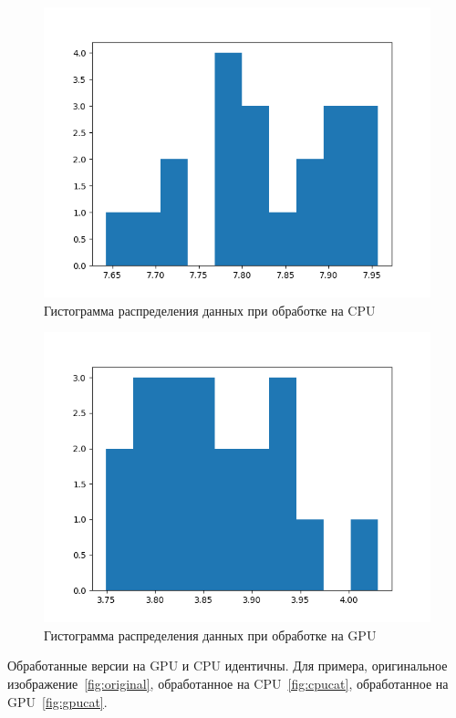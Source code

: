 \begin{figure}[H]
    \centering
    \includegraphics[width=\textwidth]{figures/CPU.png}
    \caption{Гистограмма распределения данных при обработке на CPU}
    \label{fig:cpu}
\end{figure}

\begin{figure}[H]
    \centering
    \includegraphics[width=\textwidth]{figures/GPU.png}
    \caption{Гистограмма распределения данных при обработке на GPU}
    \label{fig:gpu}
\end{figure}

Обработанные версии на GPU и CPU идентичны. Для примера, оригинальное изображение~\ref{fig:original}, обработанное на CPU~\ref{fig:cpucat}, обработанное на GPU~\ref{fig:gpucat}.

